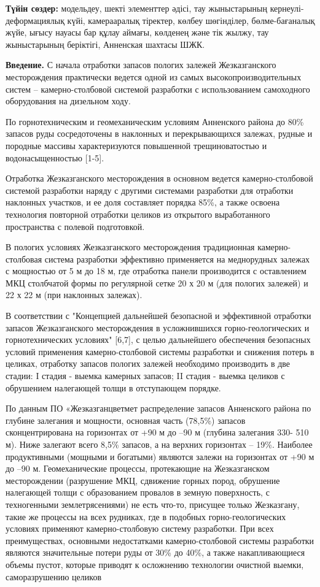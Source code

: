 {\bfseries Түйін сөздер:} модельдеу, шекті элементтер әдісі, тау
жыныстарының кернеулі-деформациялық күйі, камерааралық тіректер, көлбеу
шөгінділер, бөлме-бағаналық жүйе, ығысу науасы бар құлау аймағы,
көлденең және тік жылжу, тау жыныстарының беріктігі, Анненская шахтасы
ШЖК.
\begin{multicols}{2}

{\bfseries Введение.} С начала отработки запасов пологих залежей
Жезказганского месторождения практически ведется одной из самых
высокопроизводительных систем -- камерно-столбовой системой разработки с
использованием самоходного оборудования на дизельном ходу.

По горнотехническим и геомеханическим условиям Анненского района до 80\%
запасов руды сосредоточены в наклонных и перекрывающихся залежах, рудные
и породные массивы характеризуются повышенной трещиноватостью и
водонасыщенностью {[}1-5{]}.

Отработка Жезказганского месторождения в основном ведется
камерно-столбовой системой разработки наряду с другими системами
разработки для отработки наклонных участков, и ее доля составляет
порядка 85\%, а также освоена технология повторной отработки целиков из
открытого выработанного пространства с полевой подготовкой.

В пологих условиях Жезказганского месторождения традиционная
камерно-столбовая система разработки эффективно применяется на
меднорудных залежах с мощностью от 5 м до 18 м, где отработка панели
производится с оставлением МКЦ столбчатой формы по регулярной сетке 20 х
20 м (для пологих залежей) и 22 х 22 м (при наклонных залежах).

В соответствии с "Концепцией дальнейшей безопасной и эффективной
отработки запасов Жезказганского месторождения в усложнившихся
горно-геологических и горнотехнических условиях" {[}6,7{]}, с целью
дальнейшего обеспечения безопасных условий применения камерно-столбовой
системы разработки и снижения потерь в целиках, отработку запасов
пологих залежей необходимо производить в две стадии: I стадия - выемка
камерных запасов; II стадия - выемка целиков с обрушением налегающей
толщи в отступающем порядке.

По данным ПО «Жезказганцветмет распределение запасов Анненского района
по глубине залегания и мощности, основная часть (78,5\%) запасов
сконцентрирована на горизонтах от +90 м до --90 м (глубина залегания
330- 510 м). Ниже залегают всего 8,5\% запасов, а на верхних горизонтах
-- 19\%. Наиболее продуктивными (мощными и богатыми) являются залежи на
горизонтах от +90 м до --90 м. Геомеханические процессы, протекающие на
Жезказганском месторождении (разрушение МКЦ, сдвижение горных пород,
обрушение налегающей толщи с образованием провалов в земную поверхность,
с техногенными землетрясениями) не есть что-то, присущее только
Жезказгану, такие же процессы на всех рудниках, где в подобных
горно-геологических условиях применяют камерно-столбовую систему
разработки. При всех преимуществах, основными недостатками
камерно-столбовой системы разработки являются значительные потери руды
от 30\% до 40\%, а также накапливающиеся объемы пустот, которые приводят
к осложнению технологии очистной выемки, саморазрушению целиков


\end{multicols}

